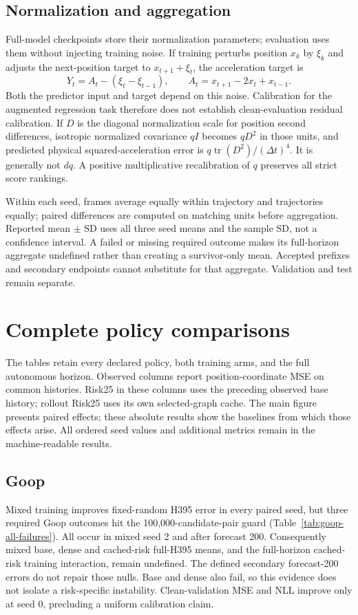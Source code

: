 \subsection{Normalization and aggregation}
\label{sec:noise-augmentation}
Full-model checkpoints store their normalization parameters; evaluation uses them without injecting training noise. If training perturbs position $x_k$ by $\xi_k$ and adjusts the next-position target to $x_{t+1}+\xi_t$, the acceleration target is
\begin{equation}
 Y_t=A_t-(\xi_t-\xi_{t-1}),\qquad A_t=x_{t+1}-2x_t+x_{t-1}.
 \label{eq:noise-target-identity}
\end{equation}
Both the predictor input and target depend on this noise. Calibration for the augmented regression task therefore does not establish clean-evaluation residual calibration. If $D$ is the diagonal normalization scale for position second differences, isotropic normalized covariance $qI$ becomes $qD^2$ in those units, and predicted physical squared-acceleration error is $q\operatorname{tr}(D^2)/(\Delta t)^4$. It is generally not $dq$. A positive multiplicative recalibration of $q$ preserves all strict score rankings.

Within each seed, frames average equally within trajectory and trajectories equally; paired differences are computed on matching units before aggregation. Reported mean $\pm$ SD uses all three seed means and the sample SD, not a confidence interval. A failed or missing required outcome makes its full-horizon aggregate undefined rather than creating a survivor-only mean. Accepted prefixes and secondary endpoints cannot substitute for that aggregate. Validation and test remain separate.

\section{Complete policy comparisons}
The tables retain every declared policy, both training arms, and the full autonomous horizon. Observed columns report position-coordinate MSE on common histories. Risk25 in these columns uses the preceding observed base history; rollout Risk25 uses its own selected-graph cache. The main figure presents paired effects; these absolute results show the baselines from which those effects arise. All ordered seed values and additional metrics remain in the machine-readable results.

\subsection{Goop}
\label{sec:goop-graph-exposure}
Mixed training improves fixed-random H395 error in every paired seed, but three required Goop outcomes hit the 100,000-candidate-pair guard (Table~\ref{tab:goop-all-failures}). All occur in mixed seed 2 and after forecast 200. Consequently mixed base, dense and cached-risk full-H395 means, and the full-horizon cached-risk training interaction, remain undefined. The defined secondary forecast-200 errors do not repair those nulls. Base and dense also fail, so this evidence does not isolate a risk-specific instability. Clean-validation MSE and NLL improve only at seed 0, precluding a uniform calibration claim.

